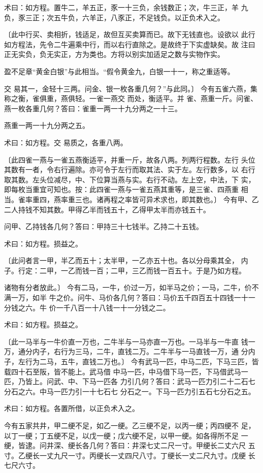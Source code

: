 \documentclass[a4paper,12pt,UTF8,twoside]{ctexbook}
\begin{document}
术曰：如方程。置牛二，羊五正，豕一十三负，余钱数正；次，牛三正，羊 九负，豕三正；次五牛负，六羊正，八豕正，不足钱负。以正负术入之。

〔此中行买、卖相折，钱适足，故但互买卖算而已。故下无钱直也。设欲以 此行如方程法，先令二牛遍乘中行，而以右行直除之。是故终于下实虚缺矣。故 注曰正无实负，负无实正，方为类也。方将以别实加适足之数与实物作实。

盈不足章“黄金白银”与此相当。“假令黄金九，白银一十一，称之重适等。

交 易其一，金轻十三两。问金、银一枚各重几何？”与此同。〕 今有五雀六燕，集称之衡，雀俱重，燕俱轻。一雀一燕交 而处，衡适平。并 雀、燕重一斤。问雀、燕一枚各重几何？答曰：雀重一两一十九分两之一十三。

燕重一两一十九分两之五。

术曰：如方程。交 易质之，各重八两。

〔此四雀一燕与一雀五燕衡适平，并重一斤，故各八两。列两行程数。左行 头位其数有一者，令右行遍除。亦可令于左行而取其法、实于左。左行数多，以 右行取其数。左头位减尽，中、下位算当燕与实。右行不动。左上空，中法，下 实，即每枚当重宜可知也。按：此四雀一燕与一雀五燕其重等，是三雀、四燕重 相当。雀率重四，燕率重三也。诸再程之率皆可异术求也，即其数也。〕 今有甲、乙二人持钱不知其数。甲得乙半而钱五十，乙得甲太半而亦钱五十。

问甲、乙持钱各几何？答曰：甲持三十七钱半。乙持二十五钱。

术曰：如方程。损益之。

〔此问者言一甲，半乙而五十；太半甲，一乙亦五十也。各以分母乘其全， 内子。行定：二甲，一乙而钱一百；二甲，三乙而钱一百五十。于是乃如方程。

诸物有分者放此。〕 今有二马，一牛，价过一万，如半马之价；一马，二牛，价不满一万，如半 牛之价。问牛、马价各几何？答曰：马价五千四百五十四钱一十一分钱之六。牛 价一千八百一十八钱一十一分钱之二。

术曰：如方程。损益之。

〔此一马半与一牛价直一万也，二牛半与一马亦直一万也。一马半与一牛直 钱一万，通分内子，右行为三马，二牛，直钱二万。二牛半与一马直钱一万，通 分内子，左行为二马，五牛，直钱二万也。〕 今有武马一匹，中马二匹，下马三匹，皆载四十石至阪，皆不能上。武马借 中马一匹，中马借下马一匹，下马借武马一匹，乃皆上。问武、中、下马一匹各 力引几何？答曰：武马一匹力引二十二石七分石之六。中马一匹力引一十七石七 分石之一。下马一匹力引五石七分石之五。

术曰：如方程。各置所借，以正负术入之。

今有五家共井，甲二绠不足，如乙一绠。乙三绠不足，以丙一绠；丙四绠不 足，以丁一绠；丁五绠不足，以戊一绠；戊六绠不足，以甲一绠。如各得所不足 一绠，皆逮。问井深、绠长各几何？答曰：井深七丈二尺一寸。甲绠长二丈六尺 五寸。乙绠长一丈九尺一寸。丙绠长一丈四尺八寸。丁绠长一丈二尺九寸。戊绠 长七尺六寸。
\end{document}
